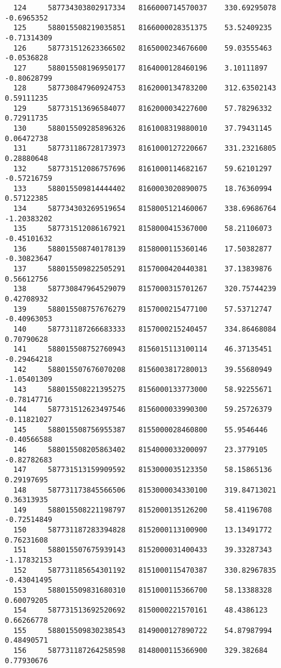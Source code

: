 \documentclass[a4paper,11pt]{article}
\begin{document}
\begin{verbatim}
  124     587734303802917334   8166000714570037    330.69295078   -0.6965352   
  125     588015508219035851   8166000028351375    53.52409235    -0.71314309  
  126     587731512623366502   8165000234676600    59.03555463    -0.0536828   
  127     588015508196950177   8164000128460196    3.10111897     -0.80628799  
  128     587730847960924753   8162000134783200    312.63502143   0.59111235   
  129     587731513696584077   8162000034227600    57.78296332    0.72911735   
  130     588015509285896326   8161008319880010    37.79431145    0.06472738   
  131     587731186728173973   8161000127220667    331.23216805   0.28880648   
  132     587731512086757696   8161000114682167    59.62101297    -0.57216759  
  133     588015509814444402   8160003020890075    18.76360994    0.57122385   
  134     587734303269519654   8158005121460067    338.69686764   -1.20383202  
  135     587731512086167921   8158000415367000    58.21106073    -0.45101632  
  136     588015508740178139   8158000115360146    17.50382877    -0.30823647  
  137     588015509822505291   8157000420440381    37.13839876    0.56612756   
  138     587730847964529079   8157000315701267    320.75744239   0.42708932   
  139     588015508757676279   8157000215477100    57.53712747    -0.40963053  
  140     587731187266683333   8157000215240457    334.86468084   0.70790628   
  141     588015508752760943   8156015113100114    46.37135451    -0.29464218  
  142     588015507676070208   8156003817280013    39.55680949    -1.05401309  
  143     588015508221395275   8156000133773000    58.92255671    -0.78147716  
  144     587731512623497546   8156000033990300    59.25726379    -0.11821027  
  145     588015508756955387   8155000028460800    55.9546446     -0.40566588  
  146     588015508205863402   8154000033200097    23.3779105     -0.82782683  
  147     587731513159909592   8153000035123350    58.15865136    0.29197695   
  148     587731173845566506   8153000034330100    319.84713021   0.36313935   
  149     588015508221198797   8152000135126200    58.41196708    -0.72514849  
  150     587731187283394828   8152000113100900    13.13491772    0.76231608   
  151     588015507675939143   8152000031400433    39.33287343    -1.17832153  
  152     587731185654301192   8151000115470387    330.82967835   -0.43041495  
  153     588015509831680310   8151000115366700    58.13388328    0.60079205   
  154     587731513692520692   8150000221570161    48.4386123     0.66266778   
  155     588015509830238543   8149000127890722    54.87987994    0.48490571   
  156     587731187264258598   8148000115366900    329.382684     0.77930676   

\end{verbatim}
\end{document}
